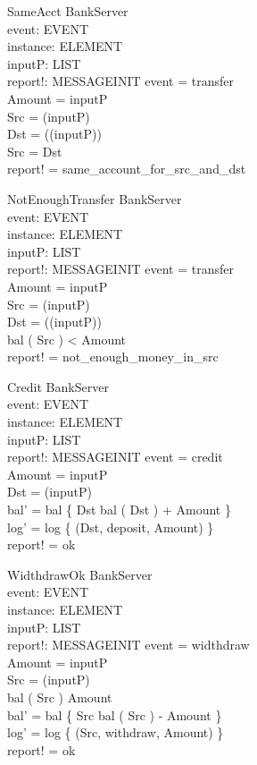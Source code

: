 \begin{schema}{SameAcct}
\Xi BankServer \\
event: EVENT \\
instance: ELEMENT \\
inputP: LIST \\
report!: MESSAGEINIT
\where event = transfer \\
Amount = \head inputP \\
Src = \head (\tail inputP) \\
Dst = \head (\tail (\tail inputP)) \\
Src = Dst \\
report! = same\_account\_for\_src\_and\_dst 
\end{schema}

\begin{schema}{NotEnoughTransfer}
\Xi BankServer \\
event: EVENT \\
instance: ELEMENT \\
inputP: LIST \\
report!: MESSAGEINIT
\where event = transfer \\
Amount = \head inputP \\
Src = \head (\tail inputP) \\
Dst = \head (\tail (\tail inputP)) \\
bal ( Src ) < Amount \\
report! = not\_enough\_money\_in\_src 
\end{schema}


\begin{schema}{Credit}
\Delta BankServer \\
event: EVENT \\
instance: ELEMENT \\
inputP: LIST \\
report!: MESSAGEINIT
\where event = credit \\
Amount = \head inputP \\
Dst = \head (\tail inputP) \\
bal' = bal \oplus \{ Dst \map bal ( Dst ) + Amount \} \\
log' = log \uni \{ (Dst, deposit, Amount) \} \\
report! = ok 
\end{schema}

\begin{schema}{WidthdrawOk}
\Delta BankServer \\
event: EVENT \\
instance: ELEMENT \\
inputP: LIST \\
report!: MESSAGEINIT
\where event = widthdraw \\
Amount = \head inputP \\
Src = \head (\tail inputP) \\
bal ( Src ) \geq Amount \\
bal' = bal \oplus \{ Src \map bal ( Src ) - Amount \} \\
log' = log \uni \{ (Src, withdraw, Amount) \} \\
report! = ok 
\end{schema}

